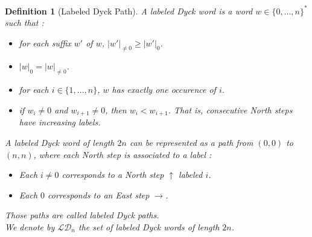 \documentclass[12pt]{report}
\newtheorem{definition}{Definition}
\begin{document}
\begin{definition}[Labeled Dyck Path]
    A \emph{labeled Dyck word} is a word $w \in 
    \{0, \ldots, n\}^*$ such that :
    \begin{itemize}
        \item for each suffix $w'$ of $w$,
            $|w'|_{\neq 0} \geqslant |w'|_0$.
        \item $|w|_0 = |w|_{\neq 0}$.
        \item for each $i \in \{1, \ldots, n\}$, $w$ has 
            exactly one occurence of $i$.
        \item if $w_i \neq 0$ and $w_{i+1} \neq 0$,
            then $w_i < w_{i+1}$. That is, consecutive
            North steps have increasing labels.
    \end{itemize}
    A labeled Dyck word of length $2n$ can be represented
    as a path from $(0,0)$ to $(n,n)$, where each North
    step is associated to a label :
    \begin{itemize}
        \item Each $i \neq 0$ corresponds to a
            \emph{North step} $\uparrow$ labeled $i$.
        \item Each $0$ corresponds to an
            \emph{East step} $\rightarrow$.
    \end{itemize}
    Those paths are called \emph{labeled Dyck paths}.\\
    We denote by $\mathcal{LD}_n$ the set of labeled
    Dyck words of length $2n$.
\end{definition}
\end{document}
